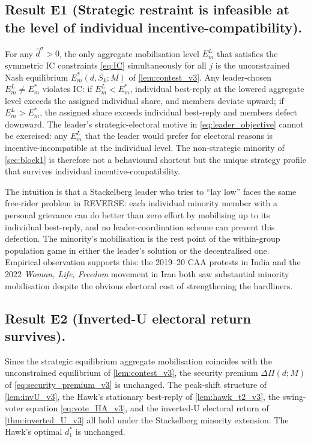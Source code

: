 \documentclass[11pt,twoside]{extarticle}
\begin{document}
\subsection*{Result E1 (Strategic restraint is infeasible at the level of individual incentive-compatibility).} For any $\hat d^\sigma>0$, the only aggregate mobilisation level $E_m^L$ that satisfies the symmetric IC constraints \eqref{eq:IC} simultaneously for all $j$ is the unconstrained Nash equilibrium $E_m^*(d,S_k;M)$ of \autoref{lem:contest_v3}. Any leader-chosen $E_m^L\ne E_m^*$ violates IC: if $E_m^L<E_m^*$, individual best-reply at the lowered aggregate level exceeds the assigned individual share, and members deviate upward; if $E_m^L>E_m^*$, the assigned share exceeds individual best-reply and members defect downward. The leader's strategic-electoral motive in \eqref{eq:leader_objective} cannot be exercised: any $E_m^L$ that the leader would prefer for electoral reasons is incentive-incompatible at the individual level. The non-strategic minority of \autoref{sec:block1} is therefore not a behavioural shortcut but the unique strategy profile that survives individual incentive-compatibility.

The intuition is that a Stackelberg leader who tries to ``lay low'' faces the same free-rider problem in REVERSE: each individual minority member with a personal grievance can do better than zero effort by mobilising up to its individual best-reply, and no leader-coordination scheme can prevent this defection. The minority's mobilisation is the rest point of the within-group population game in either the leader's solution or the decentralised one. Empirical observation supports this: the 2019--20 CAA protests in India and the 2022 \emph{Woman, Life, Freedom} movement in Iran both saw substantial minority mobilisation despite the obvious electoral cost of strengthening the hardliners.

\subsection*{Result E2 (Inverted-U electoral return survives).} Since the strategic equilibrium aggregate mobilisation coincides with the unconstrained equilibrium of \autoref{lem:contest_v3}, the security premium $\Delta\Pi(d;M)$ of \eqref{eq:security_premium_v3} is unchanged. The peak-shift structure of \autoref{lem:invU_v3}, the Hawk's stationary best-reply of \autoref{lem:hawk_t2_v3}, the swing-voter equation \eqref{eq:vote_HA_v3}, and the inverted-U electoral return of \autoref{thm:inverted_U_v3} all hold under the Stackelberg minority extension. The Hawk's optimal $d_1^*$ is unchanged.
\end{document}
